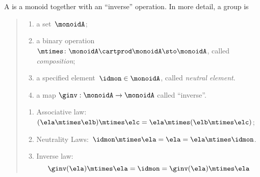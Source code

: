 

\section{}\label{sec:groups}


\begin{definition}[Group]
  \label{def:group}
  A \emph{} is a monoid together with an ``inverse'' operation.
  In more detail, a group is
  \begin{quote}
    \constit
    \begin{enumerate}
      \item a set~$\monoidA$;
      \item a binary operation~$\mtimes \colon \monoidA \cartprod \monoidA \sto \monoidA$, called \emph{composition};
      \item a specified element~$\idmon\in \monoidA$, called \emph{neutral element}.
      \item a map $\ginv: \monoidA \to \monoidA$ called ``inverse''.
    \end{enumerate}
    \condit
    \begin{enumerate}
      \item Associative law:~$(\ela\mtimes \elb)\mtimes \elc=\ela\mtimes (\elb\mtimes \elc)$;
      \item Neutrality Laws:~$\idmon\mtimes \ela=\ela=\ela \mtimes \idmon$.
      \item Inverse law:
      \begin{equation}
        \ginv(\ela) \mtimes \ela = \idmon = \ginv(\ela) \mtimes \ela
      \end{equation}
    \end{enumerate}
  \end{quote}
\end{definition}



